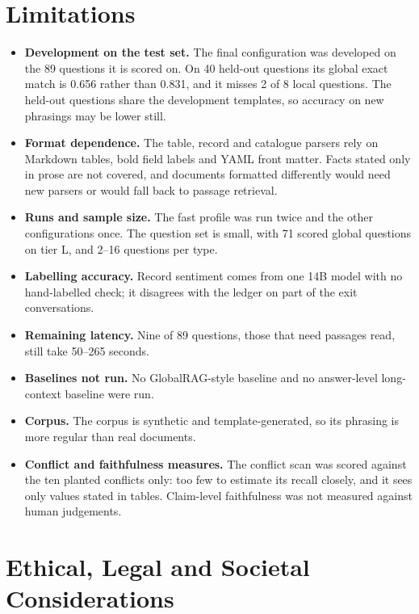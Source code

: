 \documentclass[11pt,letterpaper,oneside]{report}
\begin{document}
\section{Limitations}
\label{sec:limitations}

\begin{itemize}
  \item \textbf{Development on the test set.} The final configuration was
  developed on the 89 questions it is scored on. On 40 held-out questions
  its global exact match is 0.656 rather than 0.831, and it misses 2 of 8
  local questions. The held-out questions share the development templates,
  so accuracy on new phrasings may be lower still.
  \item \textbf{Format dependence.} The table, record and catalogue parsers
  rely on Markdown tables, bold field labels and YAML front matter. Facts
  stated only in prose are not covered, and documents formatted differently
  would need new parsers or would fall back to passage retrieval.
  \item \textbf{Runs and sample size.} The fast profile was run twice and
  the other configurations once. The question set is small, with 71 scored
  global questions on tier L, and 2--16 questions per type.
  \item \textbf{Labelling accuracy.} Record sentiment comes from one 14B
  model with no hand-labelled check; it disagrees with the ledger on part of
  the exit conversations.
  \item \textbf{Remaining latency.} Nine of 89 questions, those that need
  passages read, still take 50--265 seconds.
  \item \textbf{Baselines not run.} No GlobalRAG-style baseline and no
  answer-level long-context baseline were run.
  \item \textbf{Corpus.} The corpus is synthetic and template-generated, so
  its phrasing is more regular than real documents.
  \item \textbf{Conflict and faithfulness measures.} The conflict scan was
  scored against the ten planted conflicts only: too few to estimate its
  recall closely, and it sees only values stated in tables. Claim-level
  faithfulness was not measured against human judgements.
\end{itemize}

\section{Ethical, Legal and Societal Considerations}
\label{sec:ethics}
\end{document}
